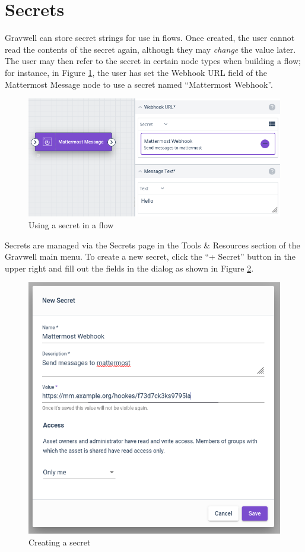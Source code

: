 
\clearpage

\section{Secrets}

Gravwell can store secret strings for use in flows. Once created, the user cannot read the contents of the secret again, although they may \emph{change} the value later. The user may then refer to the secret in certain node types when building a flow; for instance, in Figure \ref{fig:secret-flow}, the user has set the Webhook URL field of the Mattermost Message node to use a secret named ``Mattermost Webhook''.

\begin{figure}
	\includegraphics[width=0.6\linewidth]{images/secret-flow.png}
	\caption{Using a secret in a flow}
	\label{fig:secret-flow}
\end{figure}

Secrets are managed via the Secrets page in the Tools \& Resources section of the Gravwell main menu. To create a new secret, click the ``+ Secret'' button in the upper right and fill out the fields in the dialog as shown in Figure \ref{fig:new-secret}. 

\begin{figure}
	\includegraphics[width=0.5\linewidth]{images/new-secret.png}
	\caption{Creating a secret}
	\label{fig:new-secret}
\end{figure}

